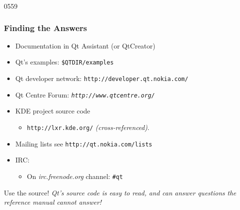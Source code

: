 \begin{slide}[fragile]{0559}
  \frametitle{Finding the Answers}\label{findingTheAnswer}
  \begin{itemize}
  \item Documentation in Qt Assistant (or QtCreator)
  \item Qt's examples:  \texttt{\$QTDIR/examples}
    \item Qt developer network: \texttt{http://developer.qt.nokia.com/}
 \item Qt Centre Forum: \textit{\texttt{http://www.qtcentre.org/}}
  \item KDE project source code
    \begin{itemize}
    \item \texttt{http://lxr.kde.org/} \textit{(cross-referenced)}.
    \end{itemize}
  \item Mailing lists see \texttt{http://qt.nokia.com/lists}
  \item IRC: 
    \begin{itemize}
    \item On \textit{irc.freenode.org} channel: \texttt{\#qt}
    \end{itemize}
  \end{itemize}
   \begin{block}{Use the source!}
    \textit{Qt's source code is easy to read, and can answer
      questions the reference manual cannot answer!} 
   \end{block}
\end{slide}
